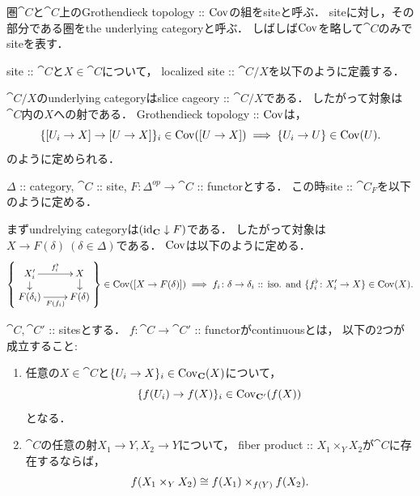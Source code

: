 \documentclass[a4paper, dvipdfmx]{jsarticle}
\begin{document}
\begin{Def}[Site]
    圏$\cat{C}$と$\cat{C}$上のGrothendieck topology :: $\Cov$の組をsiteと呼ぶ．
    siteに対し，その部分である圏をthe underlying categoryと呼ぶ．
    しばしば$\Cov$を略して$\cat{C}$のみでsiteを表す．
\end{Def}

\begin{Def}
    site :: $\cat{C}$と$X \in \cat{C}$について，
    localized site :: $\cat{C}/X$を以下のように定義する．

    $\cat{C}/X$のunderlying categoryはslice cageory :: $\cat{C}/X$である．
    したがって対象は$\cat{C}$内の$X$への射である．
    Grothendieck topology :: $\Cov$は，
    \[
        \{ [U_i \to X] \to [U \to X] \}_i \in \Cov([U \to X])
        \implies \{U_i \to U\} \in \Cov(U).
    \]
    のように定められる．
\end{Def}

\begin{Def}
    $\Delta$ :: category, $\cat{C}$ :: site, 
    $F \colon \Delta^{op} \to \cat{C}$ :: functorとする．
    この時site :: $\cat{C}_F$を以下のように定める．

    まずundrelying categoryは$(\id[\cat{C}] \downarrow F)$である．
    したがって対象は$X \to F(\delta) \ (\delta \in \Delta)$である．
    $\Cov$は以下のように定める．
    \[
        \left\{
        \vcenter{
        \xymatrix@R=8pt{
            X'_i \ar[d]\ar[r]^-{f_i^{\flat}}& X \ar[d]\\
            F(\delta_i) \ar[r]_-{F(f_i)}& F(\delta)
        }}
        \right\} \in \Cov([X \to F(\delta)])
        \implies
        f_i \colon \delta \to \delta_i \text{ :: iso. and }
        \{f_i^{\flat} \colon X'_i \to X \} \in \Cov(X).
    \]
\end{Def}

\begin{Def}
    $\cat{C}, \cat{C}'$ :: sitesとする．
    $f \colon \cat{C} \to \cat{C}'$ :: functorがcontinuousとは，
    以下の$2$つが成立すること:
    \begin{enumerate}
        \item 
        任意の$X \in \cat{C}$と$\{U_i \to X\}_i \in \Cov_{\cat{C}}(X)$について，
        \[ \{ f(U_i) \to f(X) \}_i \in \Cov_{\cat{C}'}(f(X)) \]となる．

        \item
        $\cat{C}$の任意の射$X_1 \to Y, X_2 \to Y$について，
        fiber product :: $X_1 \times_Y X_2$が$\cat{C}$に存在するならば，
        \[ f(X_1 \times_Y X_2) \iso f(X_1) \times_{f(Y)} f(X_2). \]
    \end{enumerate}
\end{Def}
\end{document}
